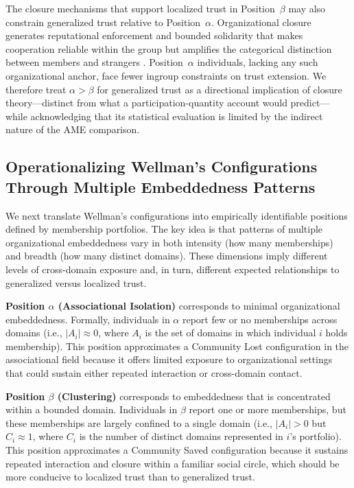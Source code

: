 The closure mechanisms that support localized trust in Position~$\beta$ may also constrain generalized trust relative to Position~$\alpha$. Organizational closure generates reputational enforcement and bounded solidarity that makes cooperation reliable within the group but amplifies the categorical distinction between members and strangers \parencite{coleman_foundations_2000, portes_social_1998}. Position~$\alpha$ individuals, lacking any such organizational anchor, face fewer ingroup constraints on trust extension. We therefore treat $\alpha > \beta$ for generalized trust as a directional implication of closure theory---distinct from what a participation-quantity account would predict---while acknowledging that its statistical evaluation is limited by the indirect nature of the AME comparison.


\subsection{Operationalizing Wellman's Configurations Through Multiple Embeddedness Patterns}

We next translate Wellman's configurations into empirically identifiable positions defined by membership portfolios. The key idea is that patterns of multiple organizational embeddedness vary in both intensity (how many memberships) and breadth (how many distinct domains). These dimensions imply different levels of cross-domain exposure and, in turn, different expected relationships to generalized versus localized trust.

\textbf{Position $\alpha$ (Associational Isolation)} corresponds to minimal organizational embeddedness. Formally, individuals in $\alpha$ report few or no memberships across domains (i.e., $|A_i|\approx 0$, where $A_i$ is the set of domains in which individual $i$ holds membership). This position approximates a Community Lost configuration in the associational field because it offers limited exposure to organizational settings that could sustain either repeated interaction or cross-domain contact.

\textbf{Position $\beta$ (Clustering)} corresponds to embeddedness that is concentrated within a bounded domain. Individuals in $\beta$ report one or more memberships, but these memberships are largely confined to a single domain (i.e., $|A_i|>0$ but $C_i\approx 1$, where $C_i$ is the number of distinct domains represented in $i$'s portfolio). This position approximates a Community Saved configuration because it sustains repeated interaction and closure within a familiar social circle, which should be more conducive to localized trust than to generalized trust.

